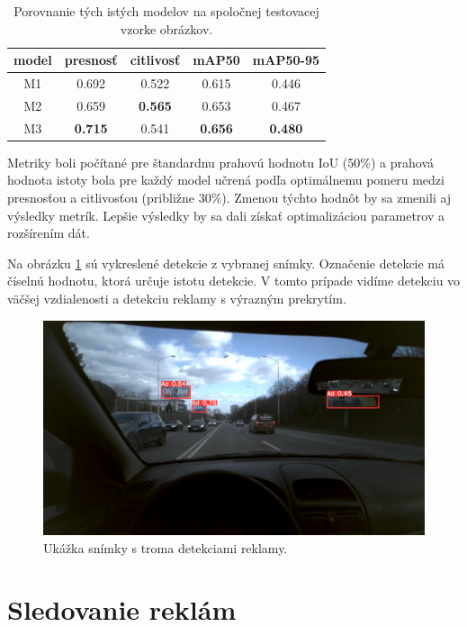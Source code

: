 \begin{table}[ht]
\centering
\begin{tabular}{ |c c c c c|  }
\hline
model & presnosť & citlivosť & mAP50 & mAP50-95 \\
\hline
M1  & 0.692	& 0.522	& 0.615	& 0.446 \\
M2  & 0.659 & \textbf{0.565} & 0.653 & 0.467 \\
M3  & \textbf{0.715} & 0.541 & \textbf{0.656} & \textbf{0.480} \\
\hline
\end{tabular}
\caption{Porovnanie tých istých modelov na spoločnej testovacej vzorke obrázkov.}
\label{table:test2}
\end{table}

Metriky boli počítané pre štandardnu prahovú hodnotu IoU (50\%) a prahová hodnota istoty bola pre každý model učrená podľa optimálnemu pomeru medzi presnosťou a citlivosťou (približne 30\%). Zmenou týchto hodnôt by sa zmenili aj výsledky metrík. Lepšie výsledky by sa dali získať optimalizáciou parametrov a rozšírením dát.

Na obrázku \ref{img:dt7} sú vykreslené detekcie z vybranej snímky. Označenie detekcie má číselnú hodnotu, ktorá určuje istotu detekcie. V tomto prípade vidíme detekciu vo väčšej vzdialenosti a detekciu reklamy s výrazným prekrytím.

\begin{figure}[ht]
    \centering
    \includegraphics[width=1\textwidth]{images/05/120.jpg}
    \caption{Ukážka snímky s troma detekciami reklamy.}
    \label{img:dt7}
\end{figure}

\section{Sledovanie reklám}

